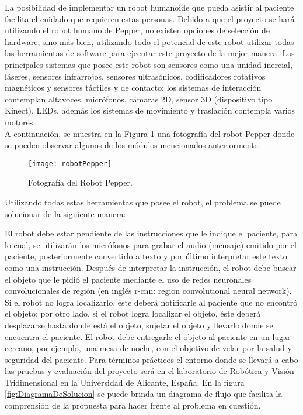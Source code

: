 La posibilidad de implementar un robot humanoide que pueda asistir al paciente facilita el cuidado que requieren
estas personas. Debido a que el proyecto se hará utilizando el robot humanoide Pepper, no existen opciones de 
selección de hardware, sino más bien, utilizando todo el potencial de este robot utilizar todas las herramientas
de software para ejecutar este proyecto de la mejor manera.  Los principales sistemas que posee este robot son
sensores como una unidad inercial, láseres, sensores infrarrojos, sensores ultrasónicos, codificadores rotativos 
magnéticos y sensores táctiles y de contacto; los sistemas de interacción contemplan altavoces, micrófonos, cámaras 2D,
sensor 3D (dispositivo tipo Kinect), LEDs, además los sistemas de movimiento y traslación contempla varios motores.\\
A continuación, se muestra en la Figura \ref{fig:RobotPepper} una fotografía del robot Pepper donde se pueden observar 
algunos de los módulos mencionados anteriormente. 
\vspace{0.2cm}


\begin{figure}[H]
	\centering
	\texttt{[image: robotPepper]}
	\caption{Fotografía del Robot Pepper. \cite{imagen_pepper} }
	\label{fig:RobotPepper}
\end{figure}


Utilizando todas estas herramientas que posee el robot, el problema se puede solucionar de la siguiente manera:

El robot debe estar pendiente de las instrucciones que le indique el paciente, para lo cual, se utilizarán los micrófonos
para grabar el audio (mensaje) emitido por el paciente, posteriormente convertirlo a texto y por último interpretar este
texto como una instrucción. Después de interpretar la instrucción, el robot debe buscar el objeto que le pidió el paciente
mediante el uso de redes neuronales convolucionales de región (en inglés r-cnn: region convolutional neural network).
Si el robot no logra localizarlo, éste deberá notificarle al paciente que no encontró el objeto; por otro lado, si el robot
logra localizar el objeto, éste deberá desplazarse hasta donde está el objeto, sujetar el objeto y llevarlo donde se encuentra
el paciente. El robot debe entregarle el objeto al paciente  en un lugar cercano, por ejemplo, una mesa de noche, con el 
objetivo de velar por la salud y seguridad del paciente. Para términos prácticos el entorno donde se llevará a cabo las 
pruebas y evaluación del proyecto será en el laboratorio de Robótica y Visión Tridimensional en la Universidad de Alicante, España. 
En la figura \ref{fig:DiagramaDeSolucion} se puede brinda un diagrama de flujo que facilita la comprensión de la propuesta para 
hacer frente al problema en cuestión. 



